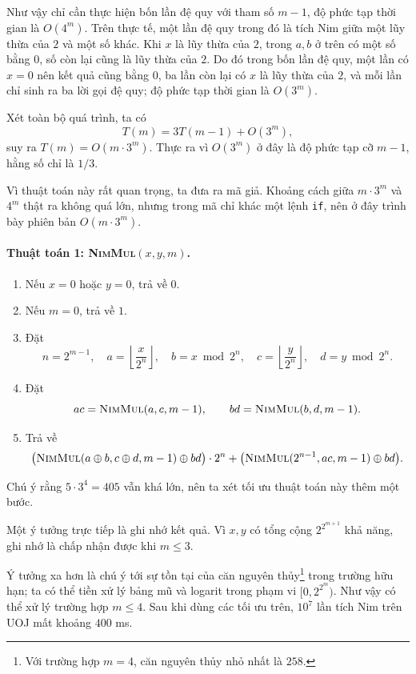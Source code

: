 \documentclass[11pt]{article}
\begin{document}
Như vậy chỉ cần thực hiện bốn lần đệ quy với tham số \(m-1\), độ phức tạp thời
gian là \(O(4^m)\). Trên thực tế, một lần đệ quy trong đó là tích Nim giữa một
lũy thừa của \(2\) và một số khác. Khi \(x\) là lũy thừa của \(2\), trong \(a,b\)
ở trên có một số bằng \(0\), số còn lại cũng là lũy thừa của \(2\). Do đó trong
bốn lần đệ quy, một lần có \(x=0\) nên kết quả cũng bằng \(0\), ba lần còn lại
có \(x\) là lũy thừa của \(2\), và mỗi lần chỉ sinh ra ba lời gọi đệ quy; độ
phức tạp thời gian là \(O(3^m)\).

Xét toàn bộ quá trình, ta có
\[
  T(m)=3T(m-1)+O(3^m),
\]
suy ra \(T(m)=O(m\cdot 3^m)\). Thực ra vì \(O(3^m)\) ở đây là độ phức tạp cỡ
\(m-1\), hằng số chỉ là \(1/3\).

Vì thuật toán này rất quan trọng, ta đưa ra mã giả. Khoảng cách giữa \(m\cdot
3^m\) và \(4^m\) thật ra không quá lớn, nhưng trong mã chỉ khác một lệnh
\texttt{if}, nên ở đây trình bày phiên bản \(O(m\cdot 3^m)\).

\paragraph{Thuật toán 1: \textsc{NimMul}\((x,y,m)\).}
\begin{enumerate}
  \item Nếu \(x=0\) hoặc \(y=0\), trả về \(0\).
  \item Nếu \(m=0\), trả về \(1\).
  \item Đặt
  \[
    n=2^{m-1},\quad
    a=\left\lfloor\frac{x}{2^n}\right\rfloor,\quad
    b=x\bmod 2^n,\quad
    c=\left\lfloor\frac{y}{2^n}\right\rfloor,\quad
    d=y\bmod 2^n.
  \]
  \item Đặt
  \[
    ac=\textsc{NimMul}(a,c,m-1),\qquad
    bd=\textsc{NimMul}(b,d,m-1).
  \]
  \item Trả về
  \[
  \bigl(\textsc{NimMul}(a\oplus b,c\oplus d,m-1)\oplus bd\bigr)\cdot 2^n
  +\bigl(\textsc{NimMul}(2^{n-1},ac,m-1)\oplus bd\bigr).
  \]
\end{enumerate}

Chú ý rằng \(5\cdot 3^4=405\) vẫn khá lớn, nên ta xét tối ưu thuật toán này
thêm một bước.

Một ý tưởng trực tiếp là ghi nhớ kết quả. Vì \(x,y\) có tổng cộng
\(2^{2^{m+1}}\) khả năng, ghi nhớ là chấp nhận được khi \(m\le 3\).

Ý tưởng xa hơn là chú ý tới sự tồn tại của căn nguyên thủy\footnote{Với trường
hợp \(m=4\), căn nguyên thủy nhỏ nhất là \(258\).} trong trường hữu hạn; ta có
thể tiền xử lý bảng mũ và logarit trong phạm vi \([0,2^{2^m})\). Như vậy có thể
xử lý trường hợp \(m\le 4\). Sau khi dùng các tối ưu trên, \(10^7\) lần tích Nim
trên UOJ mất khoảng \(400\) ms.
\end{document}
